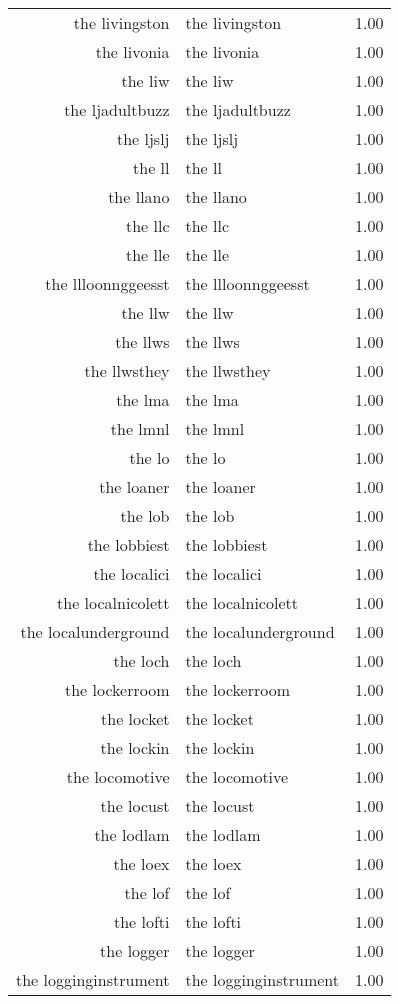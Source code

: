 \begin{table}[ht]
\begin{tabular}{rlr}
  the livingston & the livingston & 1.00 \\ 
  the livonia & the livonia & 1.00 \\ 
  the liw & the liw & 1.00 \\ 
  the ljadultbuzz & the ljadultbuzz & 1.00 \\ 
  the ljslj & the ljslj & 1.00 \\ 
  the ll & the ll & 1.00 \\ 
  the llano & the llano & 1.00 \\ 
  the llc & the llc & 1.00 \\ 
  the lle & the lle & 1.00 \\ 
  the llloonnggeesst & the llloonnggeesst & 1.00 \\ 
  the llw & the llw & 1.00 \\ 
  the llws & the llws & 1.00 \\ 
  the llwsthey & the llwsthey & 1.00 \\ 
  the lma & the lma & 1.00 \\ 
  the lmnl & the lmnl & 1.00 \\ 
  the lo & the lo & 1.00 \\ 
  the loaner & the loaner & 1.00 \\ 
  the lob & the lob & 1.00 \\ 
  the lobbiest & the lobbiest & 1.00 \\ 
  the localici & the localici & 1.00 \\ 
  the localnicolett & the localnicolett & 1.00 \\ 
  the localunderground & the localunderground & 1.00 \\ 
  the loch & the loch & 1.00 \\ 
  the lockerroom & the lockerroom & 1.00 \\ 
  the locket & the locket & 1.00 \\ 
  the lockin & the lockin & 1.00 \\ 
  the locomotive & the locomotive & 1.00 \\ 
  the locust & the locust & 1.00 \\ 
  the lodlam & the lodlam & 1.00 \\ 
  the loex & the loex & 1.00 \\ 
  the lof & the lof & 1.00 \\ 
  the lofti & the lofti & 1.00 \\ 
  the logger & the logger & 1.00 \\ 
  the logginginstrument & the logginginstrument & 1.00 \\ 

\end{tabular}
\end{table}
